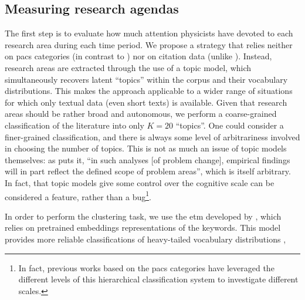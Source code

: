 \documentclass{article}
\begin{document}
\subsection{\label{sec:topics}Measuring research agendas}

The first step is to evaluate how much attention physicists have devoted to each research area during each time period. We propose a strategy that relies neither on \gls{pacs} categories (in contrast to \citealt{Jia2017,Battiston2019,Aleta2019,Tripodi2020}) nor on citation data (unlike \citealt{Zeng2019}). Instead, research areas are extracted through the use of a topic model, which simultaneously recovers latent ``topics'' within the corpus and their vocabulary distributions. This makes the approach applicable to a wider range of situations for which only textual data (even short texts) is available. Given that research areas should be rather broad and autonomous, we perform a coarse-grained classification of the literature into only $K=20$ ``topics''. One could consider a finer-grained classification, and there is always some level of arbitrariness involved in choosing the number of topics. This is not as much an issue of topic models themselves: as \citet{Gieryn1978} puts it, ``in such analyses [of problem change], empirical findings will in part reflect the defined scope of problem areas'', which is itself arbitrary. In fact, that topic models give some control over the cognitive scale can be considered a feature, rather than a bug\footnote{In fact, previous works based on the \gls{pacs} categories have leveraged the different levels of this hierarchical classification system to investigate different scales.}.

In order to perform the clustering task, we use the \gls{etm} developed by \citealt{Dieng2020}, which relies on pretrained embeddings representations of the keywords. This model provides more reliable classifications of heavy-tailed vocabulary distributions%
,%
\end{document}
